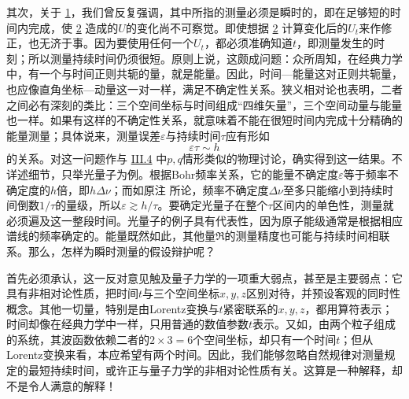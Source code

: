 \documentclass[fontsize=13pt,twoside,openany,headings=normal,parskip=false,bookmarkpackage=false,DIV=calc]{scrbook}
\begin{document}
其次，关于 \hyperref[eq:V.1.1]{1}，我们曾反复强调，其中所指的测量必须是瞬时的，即在足够短的时间内完成，使 \hyperref[eq:V.1.2]{2} 造成的$U$的变化尚不可察觉。即使想据 \hyperref[eq:V.1.2]{2} 计算变化后的$U_t$来作修正，也无济于事。因为要使用任何一个$U_t$，都必须准确知道$t$，即测量发生的时刻；所以测量持续时间仍须很短。原则上说，这颇成问题：众所周知，在经典力学中，有一个与时间\hypertarget{origpage-188}{}\label{origpage-188}正则共轭的量，就是能量。因此，时间—能量这对正则共轭量，也应像直角坐标—动量这一对一样，满足不确定性关系。狭义相对论也表明，二者之间必有深刻的类比：三个空间坐标与时间组成“四维矢量”，三个空间动量与能量也一样。如果有这样的不确定性关系，就意味着不能在很短时间内完成十分精确的能量测量；具体说来，测量误差$\varepsilon$与持续时间$\tau$应有形如
\[
\varepsilon\tau\sim h
\]
的关系。对这一问题作与 \hyperref[sec:III.4]{III.4} 中$p,\allowbreak q$情形类似的物理讨论，确实得到这一结果。不详述细节，只举光量子为例。根据Bohr频率关系，它的能量不确定度$\varepsilon$等于频率不确定度的$h$倍，即$h\Delta\nu$；而如原注 \hyperlink{note-137}{} 所论，频率不确定度$\Delta\nu$至多只能缩小到持续时间倒数$1/\tau$的量级，所以$\varepsilon\gtrsim h/\tau$。要确定光量子在整个$\tau$区间内的单色性，测量就必须遍及这一整段时间。光量子的例子具有代表性，因为原子能级通常是根据相应谱线的频率确定的。能量既然如此，其他量$\mathfrak R$的测量精度也可能与持续时间相联系。那么，怎样为瞬时测量的假设辩护呢？

首先必须承认，这一反对意见触及量子力学的一项重大弱点，甚至是主要弱点：它具有非相对论性质，把时间$t$与三个空间坐标$x,\allowbreak y,\allowbreak z$区别对待，并预设客观的同时性概念。其他一切量，特别是由Lorentz变换与$t$紧密联系的$x,\allowbreak y,\allowbreak z$，都用算符表示；时间却像在经典力学中一样，只用普通的数值参数$t$表示。又如，由两个粒子组成的系统，其波函数依赖二者的$2\times3=6$个空间坐标，却只有一个时间$t$；但从Lorentz变换来看，本应希望有两个时间。因此，我们能够忽略自然规律对测量规定的最短持续时间，或许正与量子力学的非相对论性质有关。这算是一种解释，却不是令人满意的解释！
\end{document}
